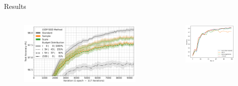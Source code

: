 \documentclass[aspectratio=169]{beamer}
\begin{document}
\begin{frame}{Results}
    \begin{columns}
        \begin{column}{0.5\textwidth}
            \begin{figure}[tb]
                \centering
                \includegraphics[width=\textwidth]{Graphics/boehnisch_sample_vs_scale.png}
                \label{fig:design_principles_dpml}
            \end{figure}
        \end{column}
        \begin{column}{0.5\textwidth}
            \begin{figure}
                \centering
                \includegraphics[width=\textwidth]{Graphics/accuracy.png}
                \label{fig:enter-label}
            \end{figure}
        \end{column}
    \end{columns}
\end{frame}
\end{document}
